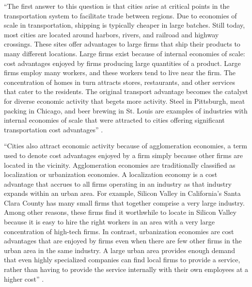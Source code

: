 \documentclass[12pt]{article}
\newcommand{\1}{\mathbbm 1}
\begin{document}
		
		``The first answer to this question is that cities arise at critical points in the transportation system to facilitate trade between regions. Due to economies of scale in transportation, shipping is typically cheaper in large batches. Still today, most cities are located around harbors, rivers, and railroad and highway crossings. These sites offer advantages to large firms that ship their products to many different locations. Large firms exist because of internal economies of scale: cost advantages enjoyed by firms producing large quantities of a product. Large firms employ many workers, and these workers tend to live near the firm. The concentration of homes in turn attracts stores, restaurants, and other services that cater to the residents. The original transport advantage becomes the catalyst for diverse economic activity that begets more activity. Steel in Pittsburgh, meat packing in Chicago, and beer brewing in St. Louis are examples of industries with internal economies of scale that were attracted to cities offering significant transportation cost advantages'' \cite{brueckner2011lectures}.
		
		``Cities also attract economic activity because of agglomeration economies, a term used to denote cost advantages enjoyed by a firm simply because other firms are located in the vicinity. Agglomeration economies are traditionally classified as localization or urbanization economies. A localization economy is a cost advantage that accrues to all firms operating in an industry as that industry expands within an urban area. For example, Silicon Valley in California's Santa Clara County has many small firms that together comprise a very large industry. Among other reasons, these firms find it worthwhile to locate in Silicon Valley because it is easy to hire the right workers in an area with a very large concentration of high-tech firms. In contrast, urbanization economies are cost advantages that are enjoyed by firms even when there are few other firms in the urban area in the same industry. A large urban area provides enough demand that even highly specialized companies can find local firms to provide a service, rather than having to provide the service internally with their own employees at a higher cost'' \cite{brueckner2011lectures}.
		
		
		
\end{document}
